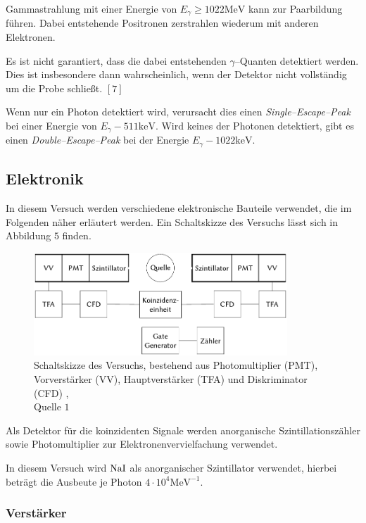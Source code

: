 \documentclass[12pt,a4paper]{scrartcl}
\numberwithin{equation}{section} %
\newcommand{\pu}[1]{\ensuremath{\mathrm{#1}}}
\renewcommand{\[}{} %
\renewcommand{\]}{\noindent} %
\begin{document}
Gammastrahlung mit einer Energie von \(E_\gamma\ge\pu{1022MeV}\) kann
zur Paarbildung führen. Dabei entstehende Positronen zerstrahlen
wiederum mit anderen Elektronen.

Es ist nicht garantiert, dass die dabei entstehenden \(\gamma\)--Quanten
detektiert werden. Dies ist insbesondere dann wahrscheinlich, wenn der
Detektor nicht vollständig um die Probe schließt. \([7]\)

Wenn nur ein Photon detektiert wird, verursacht dies einen
\emph{Single--Escape--Peak} bei einer Energie von
\(E_\gamma - \pu{511 keV}\). Wird keines der Photonen detektiert, gibt
es einen \emph{Double--Escape--Peak} bei der Energie
\(E_\gamma - \pu{1022 keV}\).

\hypertarget{elektronik}{%
\subsection{Elektronik}\label{elektronik}}

In diesem Versuch werden verschiedene elektronische Bauteile verwendet,
die im Folgenden näher erläutert werden. Ein Schaltskizze des Versuchs
lässt sich in Abbildung \(5\) finden.

\begin{figure}
	\centering
	\includegraphics[width=0.85\textwidth]{../media/B3.4/Schaltplan.pdf}
	\caption{Schaltskizze des Versuchs, bestehend aus
		Photomultiplier (PMT), Vorverstärker (VV),
		Hauptverstärker (TFA) und Diskriminator (CFD) ,\\
		Quelle \(1\)}
	\label{abb:Schaltplan}
\end{figure}

Als Detektor für die koinzidenten Signale werden anorganische
Szintillationszähler sowie Photomultiplier zur Elektronenvervielfachung
verwendet.

In diesem Versuch wird \(\ce{NaI}\) als anorganischer Szintillator
verwendet, hierbei beträgt die Ausbeute je Photon
\(\pu{4\cdot 10^{4} MeV^{-1}}\).

\hypertarget{verstuxe4rker}{%
\subsubsection{Verstärker}\label{verstuxe4rker}}
\end{document}
